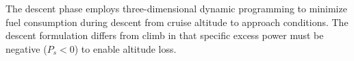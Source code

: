 The descent phase employs three-dimensional dynamic programming to minimize fuel consumption during descent from cruise altitude to approach conditions. The descent formulation differs from climb in that specific excess power must be negative ($P_s < 0$) to enable altitude loss.
